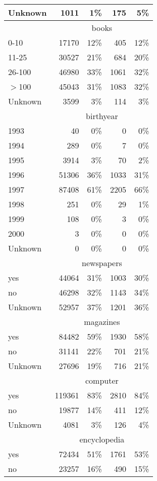 \begin{longtable}{lrrrr}
  Unknown & 1011 & 1\% & 175 & 5\% \\ 
   \hline & \multicolumn{4}{c}{books} \\ \cline{2-5} 0-10 & 17170 & 12\% & 405 & 12\% \\ 
  11-25 & 30527 & 21\% & 684 & 20\% \\ 
  26-100 & 46980 & 33\% & 1061 & 32\% \\ 
  $>$100 & 45043 & 31\% & 1083 & 32\% \\ 
  Unknown & 3599 & 3\% & 114 & 3\% \\ 
   \hline & \multicolumn{4}{c}{birthyear} \\ \cline{2-5} 1993 &  40 & 0\% &   0 & 0\% \\ 
  1994 & 289 & 0\% &   7 & 0\% \\ 
  1995 & 3914 & 3\% &  70 & 2\% \\ 
  1996 & 51306 & 36\% & 1033 & 31\% \\ 
  1997 & 87408 & 61\% & 2205 & 66\% \\ 
  1998 & 251 & 0\% &  29 & 1\% \\ 
  1999 & 108 & 0\% &   3 & 0\% \\ 
  2000 &   3 & 0\% &   0 & 0\% \\ 
  Unknown &   0 & 0\% &   0 & 0\% \\ 
   \hline & \multicolumn{4}{c}{newspapers} \\ \cline{2-5} yes & 44064 & 31\% & 1003 & 30\% \\ 
  no & 46298 & 32\% & 1143 & 34\% \\ 
  Unknown & 52957 & 37\% & 1201 & 36\% \\ 
   \hline & \multicolumn{4}{c}{magazines} \\ \cline{2-5} yes & 84482 & 59\% & 1930 & 58\% \\ 
  no & 31141 & 22\% & 701 & 21\% \\ 
  Unknown & 27696 & 19\% & 716 & 21\% \\ 
   \hline & \multicolumn{4}{c}{computer} \\ \cline{2-5} yes & 119361 & 83\% & 2810 & 84\% \\ 
  no & 19877 & 14\% & 411 & 12\% \\ 
  Unknown & 4081 & 3\% & 126 & 4\% \\ 
   \hline & \multicolumn{4}{c}{encyclopedia} \\ \cline{2-5} yes & 72434 & 51\% & 1761 & 53\% \\ 
  no & 23257 & 16\% & 490 & 15\% \\ 

\end{longtable}
